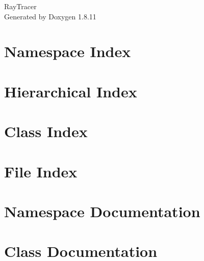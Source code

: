 \documentclass[twoside]{book}
\newcommand{\+}{\discretionary{\mbox{\scriptsize$\hookleftarrow$}}{}{}}
\newcommand{\clearemptydoublepage}{%
  \newpage{\pagestyle{empty}\cleardoublepage}%
}
\begin{document}
\hypersetup{pageanchor=false,
             bookmarksnumbered=true,
             pdfencoding=unicode
            }
\begin{titlepage}
\vspace*{7cm}
\begin{center}%
{\Large Ray\+Tracer }\\
\vspace*{1cm}
{\large Generated by Doxygen 1.8.11}\\
\end{center}
\end{titlepage}
\clearemptydoublepage
\tableofcontents
\clearemptydoublepage
{}
\hypersetup{pageanchor=true}

\chapter{Namespace Index}

\chapter{Hierarchical Index}

\chapter{Class Index}

\chapter{File Index}

\chapter{Namespace Documentation}



\chapter{Class Documentation}















































\end{document}
